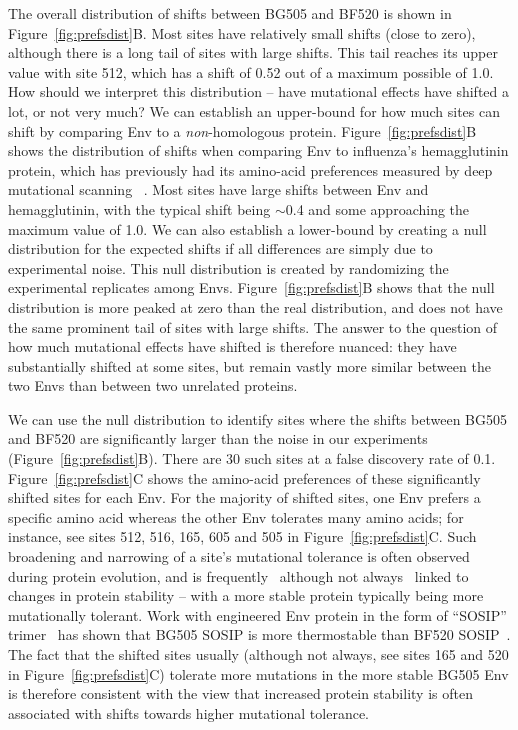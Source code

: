 \documentclass[9pt]{elife}
\begin{document}
The overall distribution of shifts between BG505 and BF520 is shown in Figure~\ref{fig:prefsdist}B.
Most sites have relatively small shifts (close to zero), although there is a long tail of sites with large shifts.
This tail reaches its upper value with site 512, which has a shift of 0.52 out of a maximum possible of 1.0.
How should we interpret this distribution -- have mutational effects have shifted a lot, or not very much?
We can establish an upper-bound for how much sites can shift by comparing Env to a \emph{non}-homologous protein.
Figure~\ref{fig:prefsdist}B shows the distribution of shifts when comparing Env to influenza's hemagglutinin protein, which has previously had its amino-acid preferences measured by deep mutational scanning~\citep{doud2016accurate} .
Most sites have large shifts between Env and hemagglutinin, with the typical shift being $\sim$0.4 and some approaching the maximum value of 1.0.
We can also establish a lower-bound by creating a null distribution for the expected shifts if all differences are simply due to experimental noise.
This null distribution is created by randomizing the experimental replicates among Envs.
Figure~\ref{fig:prefsdist}B shows that the null distribution is more peaked at zero than the real distribution, and does not have the same prominent tail of sites with large shifts.
The answer to the question of how much mutational effects have shifted is therefore nuanced: they have substantially shifted at some sites, but remain vastly more similar between the two Envs than between two unrelated proteins. 

We can use the null distribution to identify sites where the shifts between BG505 and BF520 are significantly larger than the noise in our experiments (Figure~\ref{fig:prefsdist}B).
There are 30 such sites at a false discovery rate of 0.1.
Figure~\ref{fig:prefsdist}C shows the amino-acid preferences of these significantly shifted sites for each Env.
For the majority of shifted sites, one Env prefers a specific amino acid whereas the other Env tolerates many amino acids; for instance, see sites 512, 516, 165, 605 and 505 in Figure~\ref{fig:prefsdist}C.
Such broadening and narrowing of a site's mutational tolerance is often observed during protein evolution, and is frequently~\citep{wang2002evolution,bloom2006protein,gong2013stability,kumar2017stability} although not always~\citep{starr2017alternative} linked to changes in protein stability -- with a more stable protein typically being more mutationally tolerant.
Work with engineered Env protein in the form of ``SOSIP'' trimer~\citep{binley2000recombinant,sanders2002stabilization} has shown that BG505 SOSIP is more thermostable than BF520 SOSIP~\citep{verkerke2016epitope}.
The fact that the shifted sites usually (although not always, see sites 165 and 520 in Figure~\ref{fig:prefsdist}C) tolerate more mutations in the more stable BG505 Env is therefore consistent with the view that increased protein stability is often associated with shifts towards higher mutational tolerance.
\end{document}
